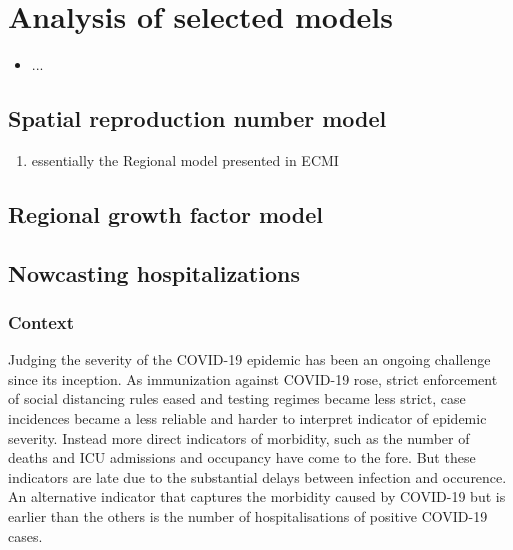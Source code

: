 \chapter{Analysis of selected models}
\label{cha:analysis_of_selected_models}
\begin{tcolorbox}[title={Contributions of this chapter}]
    \begin{itemize}
        \item ...
    \end{itemize}
\end{tcolorbox}
\newpage

\section{Spatial reproduction number model}%
\label{sec:spatial_reproduction_number_model}

\begin{enumerate}
    \item essentially the Regional model presented in ECMI
\end{enumerate}

\section{Regional growth factor model}%
\label{sec:regional_growth_factor_model}

\section{Nowcasting hospitalizations}%
\label{sec:nowcasting_hospitalizations}
\subsection{Context}
Judging the severity of the COVID-19 epidemic has been an ongoing challenge since its inception. As immunization against COVID-19 rose, strict enforcement of social distancing rules eased and testing regimes became less strict, case incidences became a less reliable and harder to interpret indicator of epidemic severity. Instead more direct indicators of morbidity, such as the number of deaths and ICU admissions and occupancy have come to the fore. But these indicators are late due to the substantial delays between infection and occurence. An alternative indicator that captures the morbidity caused by COVID-19 but is earlier than the others is the number of hospitalisations of positive COVID-19
cases.

